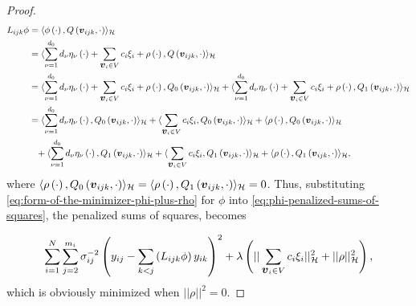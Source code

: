 \begin{proof}
\begin{align*}
L_{ijk} \phi &= \langle \phi\left(\cdot\right), Q\left(\mbox{\boldmath $v$}_{ijk}, \cdot\right) \rangle_{\mathcal{H}} \\
&=  \langle  \sum_{\nu = 1}^{d_0} d_\nu \eta_\nu\left(\cdot\right) + \sum_{\mbox{\boldmath $v$}_{i} \in V} c_i \xi_i + \rho\left(\cdot\right), Q\left(\mbox{\boldmath $v$}_{ijk}, \cdot\right) \rangle_{\mathcal{H}} \\
&= \langle  \sum_{\nu = 1}^{d_0} d_\nu \eta_\nu\left(\cdot\right) + \sum_{\mbox{\boldmath $v$}_{i} \in V} c_i \xi_i + \rho\left(\cdot\right), Q_0\left(\mbox{\boldmath $v$}_{ijk}, \cdot\right) \rangle_{\mathcal{H}} + \langle \sum_{\nu = 1}^{d_0} d_\nu \eta_\nu\left(\cdot\right) + \sum_{\mbox{\boldmath $v$}_{i} \in V} c_i \xi_i + \rho\left(\cdot\right), Q_1\left(\mbox{\boldmath $v$}_{ijk}, \cdot\right) \rangle_{\mathcal{H}} \\
&=  \langle  \sum_{\nu = 1}^{d_0} d_\nu \eta_\nu\left(\cdot\right) ,  Q_0\left(\mbox{\boldmath $v$}_{ijk}, \cdot\right) \rangle_{\mathcal{H}} +  \langle   \sum_{\mbox{\boldmath $v$}_{i} \in V} c_i \xi_i  ,  Q_0\left(\mbox{\boldmath $v$}_{ijk}, \cdot\right) \rangle_{\mathcal{H}} + \langle \rho\left(\cdot\right), Q_0\left(\mbox{\boldmath $v$}_{ijk}, \cdot\right) \rangle_{\mathcal{H}} \\ 
&\phantom{=} + \langle  \sum_{\nu = 1}^{d_0} d_\nu \eta_\nu\left(\cdot\right) ,  Q_1\left(\mbox{\boldmath $v$}_{ijk}, \cdot\right) \rangle_{\mathcal{H}} +  \langle   \sum_{\mbox{\boldmath $v$}_{i} \in V} c_i \xi_i  ,  Q_1\left(\mbox{\boldmath $v$}_{ijk}, \cdot\right) \rangle_{\mathcal{H}} + \langle \rho\left(\cdot\right), Q_1\left(\mbox{\boldmath $v$}_{ijk}, \cdot\right) \rangle_{\mathcal{H}}, 
\end{align*}
\noindent
where $\langle \rho\left(\cdot\right), Q_0\left(\mbox{\boldmath $v$}_{ijk}, \cdot\right) \rangle_{\mathcal{H}} = \langle \rho\left(\cdot\right), Q_1\left(\mbox{\boldmath $v$}_{ijk}, \cdot\right) \rangle_{\mathcal{H}} = 0$. Thus, substituting \eqref{eq:form-of-the-minimizer-phi-plus-rho} for $\phi$ into \eqref{eq:phi-penalized-sums-of-squares}, the penalized sums of squares, becomes

\begin{equation*} 
\sum_{i=1}^N \sum_{j=2}^{m_i} \sigma^{-2}_{ij}\left( y_{ij} - \sum_{k<j}\left( L_{ijk}\phi\right) y_{ik}  \right)^2 + \lambda \left(\vert \vert \sum_{\mbox{\boldmath $v$}_i \in V} c_i \xi_i \vert \vert_{\mathcal{H}}^2 + \vert \vert \rho \vert \vert_{\mathcal{H}}^2\right),
\end{equation*} 
\noindent
which is obviously minimized when $\vert \vert \rho \vert \vert^2 = 0$.
 
\end{proof}
 
